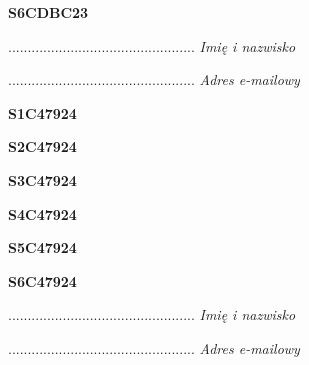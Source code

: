 \begin{turn}{90}\huge \textbf{S6CDBC23}\end{turn}

\begin{turn}{90}\begin{minipage}{\linewidth} \vspace{20mm} ................................................  \textit{Imię i nazwisko}\end{minipage}\end{turn}

\begin{turn}{90}\begin{minipage}{\linewidth} \vspace{20mm} ................................................  \textit{Adres e-mailowy}\end{minipage}\end{turn}

\begin{turn}{90}\huge \textbf{S1C47924}\end{turn}

\begin{turn}{90}\huge \textbf{S2C47924}\end{turn}

\begin{turn}{90}\huge \textbf{S3C47924}\end{turn}

\begin{turn}{90}\huge \textbf{S4C47924}\end{turn}

\begin{turn}{90}\huge \textbf{S5C47924}\end{turn}

\begin{turn}{90}\huge \textbf{S6C47924}\end{turn}

\begin{turn}{90}\begin{minipage}{\linewidth} \vspace{20mm} ................................................  \textit{Imię i nazwisko}\end{minipage}\end{turn}

\begin{turn}{90}\begin{minipage}{\linewidth} \vspace{20mm} ................................................  \textit{Adres e-mailowy}\end{minipage}\end{turn}

